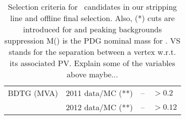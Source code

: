 \begin{table}[htb]
{{\begin{tabular}{|l|r|l|l|}
      \hline \hline  
      BDTG (MVA)     & 2011 data/MC (**)                        & --                        & $>0.2$                      \\
      {}             & 2012 data/MC (**)                        & --                        & $>0.12$                     \\
      \hline
    \end{tabular}}
}
  \caption{Selection criteria for \BsJpsiKst\ candidates in our stripping line and offline final selection. Also, (*) cuts are introduced for \LbJpsipK and \LbJpsippi peaking backgrounds suppression 
           M(\jpsi) is the PDG nominal mass for \jpsi. VS stands for the separation between a vertex w.r.t. its associated PV. {\color{red} Explain some of the variables above maybe...}}
  \label{Bs2JpsiKstSelection}
\end{table}

